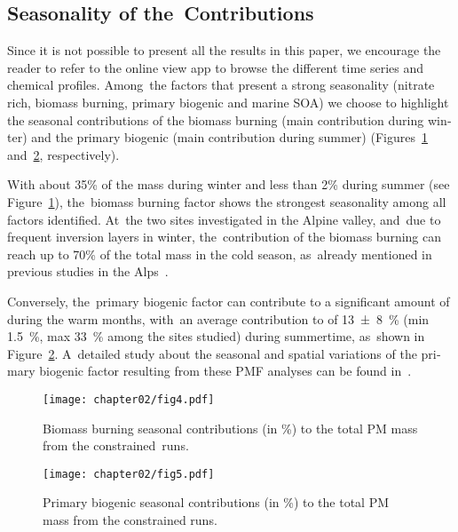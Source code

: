 \begin{otherlanguage}{english}
\subsection{Seasonality of the~Contributions}%
\label{sub:seasonality_of_the_contributions}

Since it is not possible to present all the results in this paper, we encourage the reader
to refer to the online view app to browse the different time series and chemical profiles.
Among~the factors that present a strong seasonality (nitrate rich, biomass burning,
primary biogenic and marine SOA) we choose to highlight the seasonal contributions of the
biomass burning (main contribution during winter) and the primary biogenic (main
contribution during summer) (Figures~\ref{fig:fig4} and~\ref{fig:fig5}, respectively).

With about {35}{\%} of the \PM{} mass during winter and less than {2}{\%} during summer
(see Figure~\ref{fig:fig4}), the~biomass burning factor shows the strongest seasonality
among all factors identified. At~the two sites investigated in the Alpine valley, and~due
to frequent inversion layers in winter, the~contribution of the biomass burning can reach
up to {70}{\%} of the total \PM{} mass in the cold season, as~already mentioned in
previous studies in the
Alps~\autocite{favezIntercomparison2010,bonvalotEstimating2016,srivastavaSpeciation2018,herichOverview2014}.

Conversely, the~primary biogenic factor can contribute to a significant amount of \PM{}
during the warm months, with~an average contribution to \PM{} of \SI{13\pm8}{\percent}
(min \SI{1.5}{\percent}, max \SI{33}{\percent} among the sites studied) during summertime,
as~shown in Figure~\ref{fig:fig5}. A~detailed study about the seasonal and spatial
variations of the primary biogenic factor resulting from these PMF analyses can be found
in~\mbox{\textcite{samakePolyols2019}}.

\begin{figure}[ht]
    \centering
    \texttt{[image: chapter02/fig4.pdf]}
    \caption{Biomass burning seasonal contributions (in \si{\percent}) to the total PM mass
    from the constrained~runs.}
    \label{fig:fig4}
\end{figure}

\begin{figure}[ht]
    \centering
    \texttt{[image: chapter02/fig5.pdf]}
    \caption{Primary biogenic seasonal contributions (in \si{\percent}) to the total PM mass
    from the constrained runs.}
    \label{fig:fig5}
\end{figure}



\end{otherlanguage}

